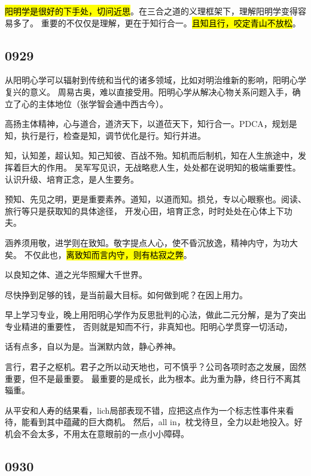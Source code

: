 \hl{阳明学是很好的下手处，切问近思}。在三合之道的义理框架下，理解阳明学变得容易多了。
重要的不仅仅是理解，更在于知行合一。\hl{且知且行，咬定青山不放松}。

\subsection{0929}

从阳明心学可以辐射到传统和当代的诸多领域，比如对明治维新的影响，阳明心学复兴的意义。
周易古奥，难以直接受用。阳明心学从解决心物关系问题入手，确立了心的主体地位（张学智会通中西古今）。

高扬主体精神，心与道合，道济天下，以道莅天下，知行合一。PDCA，规划是知，执行是行，检查是知，调节优化是行。知行并进。

知，认知差，超认知。知己知彼、百战不殆。知机而后制机，知在人生旅途中，发挥着巨大的作用。
吴军写见识，无战略悲人生，处处都在说明知的极端重要性。认识升级、培育正念，是人生要务。

预知、先见之明，更是重要素养。道知，以道而知。损兑，专以心眼察也。阅读、旅行等只是获取知的具体途径，
开发心田，培育正念，时时处处在心体上下功夫。

涵养须用敬，进学则在致知。敬字提点人心，使不昏沉放逸，精神内守，为功大矣。
不仅此也，\hl{离致知而言内守，则有枯寂之弊}。

以良知之体、道之光华照耀大千世界。

尽快挣到足够的钱，是当前最大目标。如何做到呢？在因上用力。

早上学习专业，晚上用阳明心学作为反思批判的心法，做此二元分解，是为了突出专业精进的重要性，
否则就是知而不行，非真知也。阳明心学贯穿一切活动，

话有点多，自以为是。当渊默内敛，静心养神。

言行，君子之枢机。君子之所以动天地也，可不慎乎？公司各项时态之发展，固然重要，但不是最重要。
最重要的是成长，此为根本。此为重为静，终日行不离其辎重。

从平安和人寿的结果看，lich局部表现不错，应把这点作为一个标志性事件来看待，能看到其中蕴藏的巨大商机。
然后，all in，枕戈待旦，全力以赴地投入。好机会不会太多，不用太在意眼前的一点小小障碍。

\subsection{0930}
